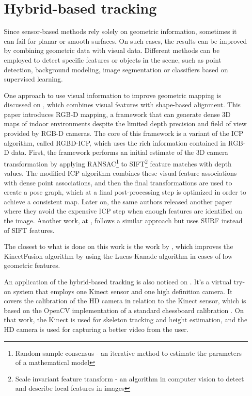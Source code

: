 \documentclass[msc, a4paper, classic, en]{ufbathesis}
\begin{document}
\section{Hybrid-based tracking}

Since sensor-based methods rely solely on geometric information, sometimes it can fail for planar or smooth surfaces. On such cases, the results can be improved by combining geometric data with visual data. Different methods can be employed to detect specific features or objects in the scene, such as point detection, background modeling, image segmentation or classifiers based on supervised learning.

One approach to use visual information to improve geometric mapping is discussed on \cite{Hen10RGB}, which combines visual features with shape-based alignment. This paper introduces RGB-D mapping, a framework that can generate dense 3D maps of indoor environments despite the limited depth precision and field of view provided by RGB-D cameras. The core of this framework is a variant of the ICP algorithm, called RGBD-ICP, which uses the rich information contained in RGB-D data. First, the framework performs an initial estimate of the 3D camera transformation by applying RANSAC\footnote{Random sample consensus - an iterative method to estimate the parameters of a mathematical model} to SIFT\footnote{Scale invariant feature transform - an algorithm in computer vision to detect and describe local features in images} feature matches with depth values. The modified ICP algorithm combines these visual feature associations with dense point associations, and then the final transformations are used to create a pose graph, which at a final post-processing step is optimized in order to achieve a consistent map. Later on, the same authors released another paper \cite{Hen12RGB} where they avoid the expensive ICP step when enough features are identified on the image. Another work, at \cite{Engelhard11real-time3-d}, follows a similar approach but uses SURF \cite{bay} instead of SIFT features.

The closest to what is done on this work is the work by \cite{kinectkanade}, which improves the KinectFusion algorithm by using the Lucas-Kanade algorithm in cases of low geometric features.

An application of the hybrid-based tracking is also noticed on \cite{tryon}. It's a virtual try-on system that employs one Kinect sensor and one high definition camera. It covers the calibration of the HD camera in relation to the Kinect sensor, which is based on the OpenCV implementation of a standard chessboard calibration \cite{matlab}. On that work, the Kinect is used for skeleton tracking and height estimation, and the HD camera is used for capturing a better video from the user.
\end{document}
